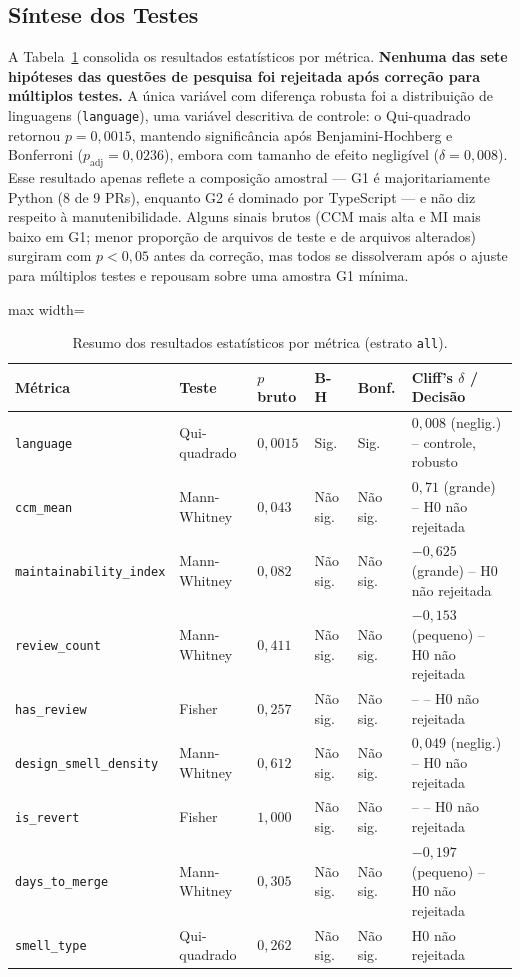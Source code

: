 \documentclass[12pt]{article}
\begin{document}
\subsection{Síntese dos Testes}

A Tabela~\ref{tab:resumo} consolida os resultados estatísticos por métrica.
\textbf{Nenhuma das sete hipóteses das questões de pesquisa foi rejeitada
após correção para múltiplos testes.} A única variável com diferença robusta
foi a distribuição de linguagens (\texttt{language}), uma variável descritiva
de controle: o Qui-quadrado retornou $p = 0{,}0015$, mantendo significância
após Benjamini-Hochberg e Bonferroni ($p_{\text{adj}} = 0{,}0236$), embora com
tamanho de efeito negligível ($\delta = 0{,}008$). Esse resultado apenas
reflete a composição amostral --- G1 é majoritariamente Python (8 de 9 PRs),
enquanto G2 é dominado por TypeScript --- e não diz respeito à
manutenibilidade. Alguns sinais brutos (CCM mais alta e MI mais baixo em G1;
menor proporção de arquivos de teste e de arquivos alterados) surgiram com
$p < 0{,}05$ antes da correção, mas todos se dissolveram após o ajuste para
múltiplos testes e repousam sobre uma amostra G1 mínima.

\begin{table}[ht]
\centering
\caption{Resumo dos resultados estatísticos por métrica (estrato \texttt{all}).}
\label{tab:resumo}
\begin{adjustbox}{max width=\textwidth}
\small
\begin{tabular}{llllll}
\toprule
\textbf{Métrica} & \textbf{Teste} & \textbf{$p$ bruto} & \textbf{B-H} & \textbf{Bonf.} & \textbf{Cliff's $\delta$ / Decisão} \\
\midrule
\texttt{language}               & Qui-quadrado & $0{,}0015$ & Sig.     & Sig.     & $0{,}008$ (neglig.) -- controle, robusto \\
\texttt{ccm\_mean}              & Mann-Whitney & $0{,}043$  & Não sig. & Não sig. & $0{,}71$ (grande) -- H0 não rejeitada \\
\texttt{maintainability\_index} & Mann-Whitney & $0{,}082$  & Não sig. & Não sig. & $-0{,}625$ (grande) -- H0 não rejeitada \\
\texttt{review\_count}          & Mann-Whitney & $0{,}411$  & Não sig. & Não sig. & $-0{,}153$ (pequeno) -- H0 não rejeitada \\
\texttt{has\_review}            & Fisher       & $0{,}257$  & Não sig. & Não sig. & -- -- H0 não rejeitada \\
\texttt{design\_smell\_density} & Mann-Whitney & $0{,}612$  & Não sig. & Não sig. & $0{,}049$ (neglig.) -- H0 não rejeitada \\
\texttt{is\_revert}             & Fisher       & $1{,}000$  & Não sig. & Não sig. & -- -- H0 não rejeitada \\
\texttt{days\_to\_merge}        & Mann-Whitney & $0{,}305$  & Não sig. & Não sig. & $-0{,}197$ (pequeno) -- H0 não rejeitada \\
\texttt{smell\_type}            & Qui-quadrado & $0{,}262$  & Não sig. & Não sig. & H0 não rejeitada \\
\bottomrule
\end{tabular}
\end{adjustbox}
\end{table}
\end{document}
